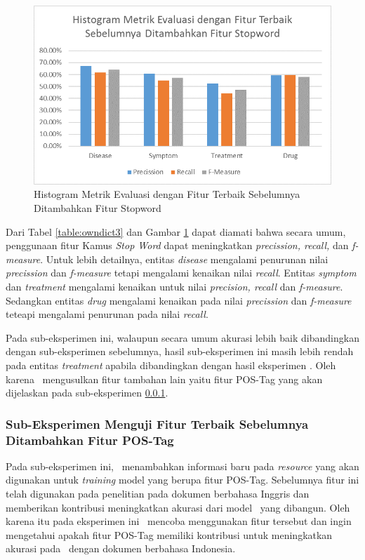 	\begin{figure}
		\centering
		\includegraphics[width=0.85\linewidth]{images/histogram3}
		\caption{Histogram Metrik Evaluasi dengan Fitur Terbaik Sebelumnya Ditambahkan Fitur Stopword}
		\label{fig:owndict3}
	\end{figure}
	
	Dari Tabel \ref{table:owndict3} dan Gambar \ref{fig:owndict3} dapat diamati bahwa secara umum, penggunaan fitur Kamus \textit{Stop Word} dapat meningkatkan \textit{precission, recall,} dan \textit{f-measure}. Untuk lebih detailnya, entitas \textit{disease} mengalami penurunan nilai \textit{precission} dan \textit{f-measure} tetapi mengalami kenaikan nilai \textit{recall}. Entitas \textit{symptom} dan \textit{treatment} mengalami kenaikan untuk nilai \textit{precision, recall} dan \textit{f-measure}. Sedangkan entitas \textit{drug} mengalami kenaikan pada nilai \textit{precission} dan \textit{f-measure} teteapi mengalami penurunan pada nilai \textit{recall}.
		
	Pada sub-eksperimen ini, walaupun secara umum akurasi lebih baik dibandingkan dengan sub-eksperimen sebelumnya, hasil sub-eksperimen ini masih lebih rendah pada entitas \textit{treatment} apabila dibandingkan dengan hasil eksperimen \cite{skripsiKakRadit}. Oleh karena \saya~mengusulkan fitur tambahan lain yaitu fitur POS-Tag yang akan dijelaskan pada sub-eksperimen \ref{eks:subekspostag}.
	
	\subsubsection{Sub-Eksperimen Menguji Fitur Terbaik Sebelumnya Ditambahkan Fitur POS-Tag}\label{eks:subekspostag}
	Pada sub-eksperimen ini, \saya~menambahkan informasi baru pada \textit{resource} yang akan digunakan untuk \textit{training} model yang berupa fitur POS-Tag. Sebelumnya fitur ini telah digunakan pada penelitian \cite{abacha2011medical} pada dokumen berbahasa Inggris dan memberikan kontribusi meningkatkan akurasi dari model \mer~yang dibangun. Oleh karena itu pada eksperimen ini \saya~mencoba menggunakan fitur tersebut dan ingin mengetahui apakah fitur POS-Tag memiliki kontribusi untuk meningkatkan akurasi pada \mer~dengan dokumen berbahasa Indonesia. 
	
